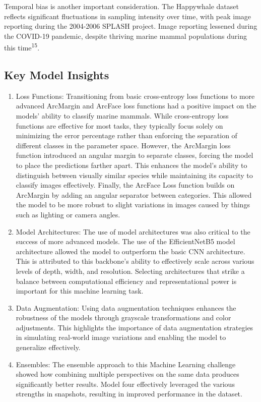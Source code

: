 \documentclass[twocolumn]{article}
\begin{document}
Temporal bias is another important consideration. The Happywhale dataset reflects significant fluctuations in sampling intensity over time, with peak image reporting during the 2004-2006 SPLASH project. Image reporting lessened during the COVID-19 pandemic, despite thriving marine mammal populations during this time\textsuperscript{15}. 

\subsection{Key Model Insights}

\begin{enumerate}
    \item Loss Functions: Transitioning from basic cross-entropy loss functions to more advanced ArcMargin and ArcFace loss functions had a positive impact on the models' ability to classify marine mammals. While cross-entropy loss functions are effective for most tasks, they typically focus solely on minimizing the error percentage rather than enforcing the separation of different classes in the parameter space. However, the ArcMargin loss function introduced an angular margin to separate classes, forcing the model to place the predictions farther apart. This enhances the model's ability to distinguish between visually similar species while maintaining its capacity to classify images effectively. Finally, the ArcFace Loss function builds on ArcMargin by adding an angular separator between categories. This allowed the model to be more robust to slight variations in images caused by things such as lighting or camera angles. 
    \item Model Architectures: The use of model architectures was also critical to the success of more advanced models. The use of the EfficientNetB5 model architecture allowed the model to outperform the basic CNN architecture. This is attributed to this backbone's ability to effectively scale across various levels of depth, width, and resolution. Selecting architectures that strike a balance between computational efficiency and representational power is important for this machine learning task.
    \item Data Augmentation: Using data augmentation techniques enhances the robustness of the models through grayscale transformations and color adjustments. This highlights the importance of data augmentation strategies in simulating real-world image variations and enabling the model to generalize effectively. 
    \item Ensembles: The ensemble approach to this Machine Learning challenge showed how combining multiple perspectives on the same data produces significantly better results. Model four effectively leveraged the various strengths in snapshots, resulting in improved performance in the dataset.

\end{enumerate}
\end{document}
